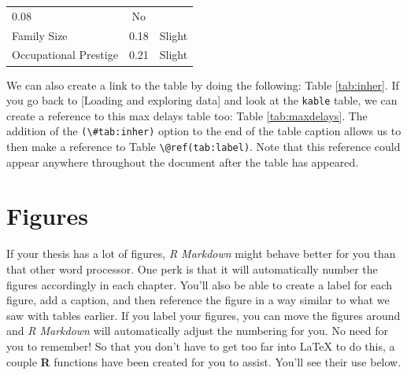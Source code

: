 \documentclass[12pt,twoside]{reedthesis}
\theoremstyle{definition}
\theoremstyle{definition}
\theoremstyle{remark}
\begin{document}
\begin{longtable}[]{@{}lcl@{}}
\begin{minipage}[t]{0.47\columnwidth}
  0.08\strut
  \end{minipage} & \begin{minipage}[t]{0.16\columnwidth}\raggedright\strut
  No\strut
  \end{minipage}\tabularnewline
  \begin{minipage}[t]{0.29\columnwidth}\raggedright\strut
  Family Size\strut
  \end{minipage} & \begin{minipage}[t]{0.47\columnwidth}\centering\strut
  0.18\strut
  \end{minipage} & \begin{minipage}[t]{0.16\columnwidth}\raggedright\strut
  Slight\strut
  \end{minipage}\tabularnewline
  \begin{minipage}[t]{0.29\columnwidth}\raggedright\strut
  Occupational Prestige\strut
  \end{minipage} & \begin{minipage}[t]{0.47\columnwidth}\centering\strut
  0.21\strut
  \end{minipage} & \begin{minipage}[t]{0.16\columnwidth}\raggedright\strut
  Slight\strut
  \end{minipage}\tabularnewline
  \bottomrule
  \end{longtable}
  
  We can also create a link to the table by doing the following: Table
  \ref{tab:inher}. If you go back to {[}Loading and exploring data{]} and
  look at the \texttt{kable} table, we can create a reference to this max
  delays table too: Table \ref{tab:maxdelays}. The addition of the
  \texttt{(\textbackslash{}\#tab:inher)} option to the end of the table
  caption allows us to then make a reference to Table
  \texttt{\textbackslash{}@ref(tab:label)}. Note that this reference could
  appear anywhere throughout the document after the table has appeared.
  
  \clearpage
  
  \section{Figures}\label{figures}
  
  If your thesis has a lot of figures, \emph{R Markdown} might behave
  better for you than that other word processor. One perk is that it will
  automatically number the figures accordingly in each chapter. You'll
  also be able to create a label for each figure, add a caption, and then
  reference the figure in a way similar to what we saw with tables
  earlier. If you label your figures, you can move the figures around and
  \emph{R Markdown} will automatically adjust the numbering for you. No
  need for you to remember! So that you don't have to get too far into
  LaTeX to do this, a couple \textbf{R} functions have been created for
  you to assist. You'll see their use below.
  
\end{document}
